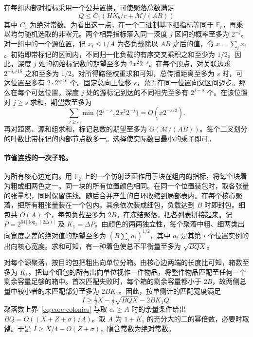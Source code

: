 在每组内部对指标采用一个公共置换，可使聚落总数满足 \begin{equation}
 Q\le C_1\left( HN_b/r+\mathcal M/(AB)\right)
 \label{eq:core-colonies}
\end{equation} 其中 \(C_1\) 为绝对常数。为看出这一点，在一个二进制基下把指标等同于 \(\mathbb F_r\)，再乘以均匀随机选取的非零元。两个相异指标落入同一深度 \(j\) 区间的概率至多为 \(2^{-j}\)。对一组中的一个源位置，记 \(x_i\le1/A\) 为各负载除以 \(AB\) 之后的值，令 \(x=\sum_i x_i\)。初始即带标记的区间内，不同归一化负载的有序交叉乘积之和至少为 \(1/2\)。因此，深度 \(j\) 处的初始标记数的期望至多为 \(2x^2 2^{-j}\)。在每个顶点，对关联边求 \(2^{-s_e/16}\) 之和至多为 \(1/2\)。对所得路径权重求和可知，总传播距离至多为 \(s\) 时，可达位置至多有 \(2\cdot2^{s/16}\) 个。固定总向上位移 \(s\)，允许在同一位置向父区间迈步。那么在每个可达位置，深度 \(j\) 处的源标记到达的不同祖先至多有 \(2^{j-s}\) 个。在该位置对 \(j\ge s\) 求和，期望数至多为 \[
 \sum_{j\ge s}\min\{2^{j-s},2x^2 2^{-j}\}=O(x2^{-s/2}).
\] 再对距离、源和组求和，标记总数的期望至多为 \(O(\mathcal M/(AB))\)。每个二叉划分的叶数比带标记的内部节点数多一。选择使实际数目最小的乘子即可。

\paragraph{节省连线的一次子轮。} 为所有核心边定向。用 \(\mathbb F_2\) 上的一个仿射泛函作用于块在组内的指标，将每个块着为粗或细两色之一。同一块的所有位置颜色相同。在同一个位置装包时，取各张量的张量积，同时保留连线。随后合并产生的自环收缩到局部表内。在每个核心聚落，把所有粗张量装在一个包内。其余依次装成细包，负载达到 \(B\) 时即封包。细包共 \(O(A)\) 个，每包负载至多为 \(2B\)。在冻结聚落，把各列表拼接起来。记 \(P=2^{64\lceil\log_2(2\Delta)\rceil}\) 及 \(K_1=\Delta P\)。由颜色的两两独立性，每个聚落中粗、细两类出向宽度之差的绝对值的期望至多为 \((B\sum_i a_i)^{1/2}\)，其中 \(a_i\) 是其第 \(i\) 个位置实例的出向核心宽度。求和可知，有一种着色使总不平衡量至多为 \(\sqrt{BQX}\)。

对每个源聚落，按目的包把粗出向单位分箱。由核心边两端的长度比可知，箱数至多为 \(K_1\)。把每个细包的所有出向单位视作一件物品，将整件物品匹配至任何一个剩余容量足够的箱中。首次匹配失败时，每个箱的剩余容量都小于 \(2B\)，故两侧总量中较小者的未匹配部分至多为 \(2BK_1\)。因此，按单侧计的匹配宽度满足 \[
 I\ge \tfrac12X-\tfrac12\sqrt{BQX}-2BK_1Q.
\] 聚落数上界~\eqref{eq:core-colonies} 与取 \(c_*\ge A\) 时的余量条件给出 \(BQ=O((X+Z+\sigma)/A)\)。取 \(A\) 为 \(1+K_1\) 的充分大的二的幂倍数，必要时取整。于是 \(I\ge X/4-O(Z+\sigma)\)，隐含常数为绝对常数。


